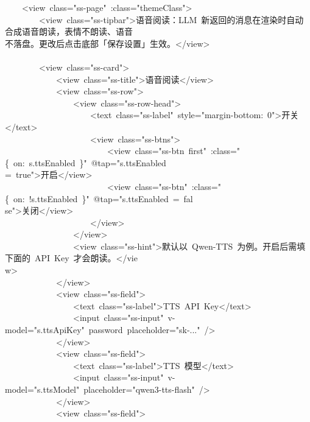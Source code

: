 \documentclass[a4paper,10pt]{article}
\begin{document}
\newpage

{\ttfamily\footnotesize\raggedright
~~~~<view~class="ss-page"~:class="themeClass">\\
~~~~~~~~<view~class="ss-tipbar">语音阅读：LLM~新返回的消息在渲染时自动合成语音朗读，表情不朗读、语音\\
不落盘。更改后点击底部「保存设置」生效。</view>\\
\mbox{}\\
~~~~~~~~<view~class="ss-card">\\
~~~~~~~~~~~~<view~class="ss-title">语音阅读</view>\\
~~~~~~~~~~~~<view~class="ss-row">\\
~~~~~~~~~~~~~~~~<view~class="ss-row-head">\\
~~~~~~~~~~~~~~~~~~~~<text~class="ss-label"~style="margin-bottom:~0">开关</text>\\
~~~~~~~~~~~~~~~~~~~~<view~class="ss-btns">\\
~~~~~~~~~~~~~~~~~~~~~~~~<view~class="ss-btn~first"~:class="\{~on:~s.ttsEnabled~\}"~@tap="s.ttsEnabled~\\
=~true">开启</view>\\
~~~~~~~~~~~~~~~~~~~~~~~~<view~class="ss-btn"~:class="\{~on:~!s.ttsEnabled~\}"~@tap="s.ttsEnabled~=~fal\\
se">关闭</view>\\
~~~~~~~~~~~~~~~~~~~~</view>\\
~~~~~~~~~~~~~~~~</view>\\
~~~~~~~~~~~~~~~~<view~class="ss-hint">默认以~Qwen-TTS~为例。开启后需填下面的~API~Key~才会朗读。</vie\\
w>\\
~~~~~~~~~~~~</view>\\
~~~~~~~~~~~~<view~class="ss-field">\\
~~~~~~~~~~~~~~~~<text~class="ss-label">TTS~API~Key</text>\\
~~~~~~~~~~~~~~~~<input~class="ss-input"~v-model="s.ttsApiKey"~password~placeholder="sk-..."~/>\\
~~~~~~~~~~~~</view>\\
~~~~~~~~~~~~<view~class="ss-field">\\
~~~~~~~~~~~~~~~~<text~class="ss-label">TTS~模型</text>\\
~~~~~~~~~~~~~~~~<input~class="ss-input"~v-model="s.ttsModel"~placeholder="qwen3-tts-flash"~/>\\
~~~~~~~~~~~~</view>\\
~~~~~~~~~~~~<view~class="ss-field">\\
}
\end{document}

